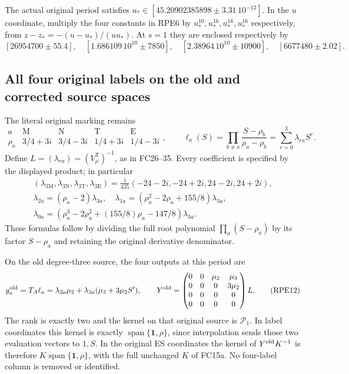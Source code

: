 \documentclass[11pt]{article}
\begin{document}
The actual original period satisfies
$u_*\in[45.20902385898\mathbin\pm3.31\,10^{-12}]$.
In the $u$ coordinate, multiply the four constants in RPE6 by
$u_*^{10},u_*^{16},u_*^{16},u_*^{16}$ respectively, from
$z-z_*=-(u-u_*)/(uu_*)$.
At $s=1$ they are enclosed respectively by
\[
 [26954700\mathbin\pm55.4],\quad
 [1.686109\,10^{10}\mathbin\pm7850],\quad
 [2.38964\,10^{10}\mathbin\pm10900],\quad
 [6677480\mathbin\pm2.02].
 \tag{RPE9}
\]

\subsection{All four original labels on the old and corrected source spaces}
The literal original marking remains
\[
 \begin{array}{c|cccc}
 a&\mathrm M&\mathrm N&\mathrm T&\mathrm E\\\hline
 \rho_a&3/4+3i&3/4-3i&1/4+3i&1/4-3i
 \end{array},\qquad
 \ell_a(S)=\prod_{b\ne a}\frac{S-\rho_b}{\rho_a-\rho_b}
             =\sum_{r=0}^3\lambda_{ra}S^r.
 \tag{RPE10}
\]
Define $L=(\lambda_{ra})=(V_\rho^{\mathsf T})^{-1}$, as in FC26--35.
Every coefficient is specified by the displayed product; in particular
\[
 \begin{gathered}
 (\lambda_{3\mathrm M},\lambda_{3\mathrm N},
   \lambda_{3\mathrm T},\lambda_{3\mathrm E})
 =\frac1{435}(-24-2i,-24+2i,24-2i,24+2i),\\
 \lambda_{2a}=(\rho_a-2)\lambda_{3a},\quad
 \lambda_{1a}=(\rho_a^2-2\rho_a+155/8)\lambda_{3a},\\
 \lambda_{0a}=(\rho_a^3-2\rho_a^2+(155/8)\rho_a-147/8)\lambda_{3a}.
 \end{gathered}\tag{RPE11}
\]
These formulas follow by dividing the full root polynomial
$\prod_a(S-\rho_a)$ by its factor $S-\rho_a$ and retaining the
original derivative denominator.

On the old degree-three source, the four outputs at this period are
\[
 y_a^{\rm old}=T_A\ell_a
       =\lambda_{2a}\mu_2+\lambda_{3a}(\mu_3+3\mu_2S'),\qquad
 Y^{\rm old}=
 \begin{pmatrix}
 0&0&\mu_2&\mu_3\\0&0&0&3\mu_2\\0&0&0&0\\0&0&0&0
 \end{pmatrix}L.
 \tag{RPE12}
\]
The rank is exactly two and the kernel on that original source is
$\mathcal P_1$. In label coordinates this kernel is exactly
$\operatorname{span}\{\boldsymbol1,\rho\}$, since interpolation
sends those two evaluation vectors to $1,S$.
In the original ES coordinates the kernel of
$Y^{\rm old}K^{-1}$ is therefore
$K\operatorname{span}\{\boldsymbol1,\rho\}$, with the full
unchanged $K$ of FC15a. No four-label column is removed or identified.
\end{document}
